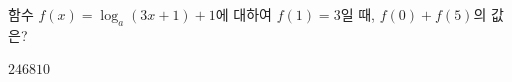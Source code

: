 함수 $f(x)=\log_a (3x+1)+1$에 대하여 $f(1)=3$일 때, $f(0)+f(5)$의 값은? 
\begin{choices32}{$2$}{$4$}{$6$}{$8$}{$10$}\end{choices32}
